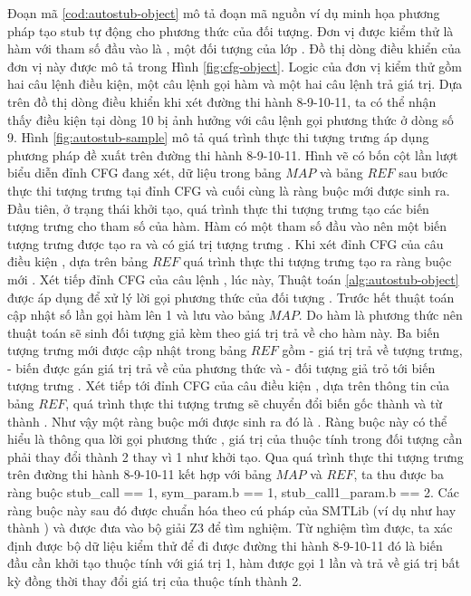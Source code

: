 Đoạn mã \ref{cod:autostub-object} mô tả đoạn mã nguồn ví dụ minh họa phương pháp tạo stub tự động cho phương thức của đối tượng. Đơn vị được kiểm thử là hàm  với tham số đầu vào là , một đối tượng của lớp . Đồ thị dòng điều khiển của đơn vị này được mô tả trong Hình \ref{fig:cfg-object}. Logic của đơn vị kiểm thử gồm hai câu lệnh điều kiện, một câu lệnh gọi hàm và một hai câu lệnh trả giá trị. Dựa trên đồ thị dòng điều khiển khi xét đường thi hành 8-9-10-11, ta có thể nhận thấy điều kiện  tại dòng 10 bị ảnh hưởng với câu lệnh gọi phương thức ở dòng số 9. Hình \ref{fig:autostub-sample} mô tả quá trình thực thi tượng trưng áp dụng phương pháp đề xuất trên đường thi hành 8-9-10-11. Hình vẽ có bốn cột lần lượt biểu diễn đỉnh CFG đang xét, dữ liệu trong bảng $MAP$ và bảng $REF$ sau bước thực thi tượng trưng tại đỉnh CFG và cuối cùng là ràng buộc mới được sinh ra. Đầu tiên, ở trạng thái khởi tạo, quá trình thực thi tượng trưng tạo các biến tượng trưng cho tham số của hàm. Hàm  có một tham số đầu vào nên một biến tượng trưng  được tạo ra và có giá trị tượng trưng . Khi xét đỉnh CFG của câu điều kiện , dựa trên bảng $REF$ quá trình thực thi tượng trưng tạo ra ràng buộc mới . Xét tiếp đỉnh CFG của câu lệnh , lúc này, Thuật toán \ref{alg:autostub-object} được áp dụng để xử lý lời gọi phương thức của đối tượng . Trước hết thuật toán cập nhật số lần gọi hàm  lên 1 và lưu vào bảng $MAP$. Do hàm  là phương thức nên thuật toán sẽ sinh đối tượng giả kèm theo giá trị trả về cho hàm này. Ba biến tượng trưng mới được cập nhật trong bảng $REF$ gồm  - giá trị trả về tượng trưng,  - biến được gán giá trị trả về của phương thức và  - đối tượng giả trỏ tới biến tượng trưng . Xét tiếp tới đỉnh CFG của câu điều kiện , dựa trên thông tin của bảng $REF$, quá trình thực thi tượng trưng sẽ chuyển đổi biến  gốc thành  và từ  thành . Như vậy một ràng buộc mới được sinh ra đó là . Ràng buộc này có thể hiểu là thông qua lời gọi phương thức , giá trị của thuộc tính  trong đối tượng  cần phải thay đổi thành 2 thay vì 1 như khởi tạo. Qua quá trình thực thi tượng trưng trên đường thi hành 8-9-10-11 kết hợp với bảng $MAP$ và $REF$, ta thu được ba ràng buộc {stub\_call == 1, sym\_param.b == 1, stub\_call1\_param.b == 2}. Các ràng buộc này sau đó được chuẩn hóa theo cú pháp của SMTLib (ví dụ như hay  thành ) và được đưa vào bộ giải Z3 để tìm nghiệm. Từ nghiệm tìm được, ta xác định được bộ dữ liệu kiểm thử để đi được đường thi hành 8-9-10-11 đó là biến  đầu cần khởi tạo thuộc tính  với giá trị 1, hàm  được gọi 1 lần và trả về giá trị bất kỳ đồng thời thay đổi giá trị của thuộc tính  thành 2. 
